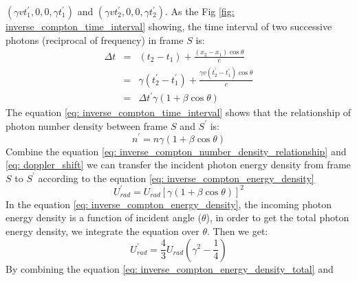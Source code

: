 \documentclass[12pt]{report}
\begin{document}
          $\left(\gamma v t_{1}^{\prime}, 0, 0, \gamma t_{1}^{\prime}\right)$ and 
          $\left(\gamma v t_{2}^{\prime}, 0, 0, \gamma t_{2}^{\prime}\right)$. 
          As the Fig \ref{fig: inverse_compton_time_interval} showing, the time interval of two successive 
          photons (reciprocal of frequency) in frame $S$ is: 
          \begin{eqnarray}
            \label{eq: inverse_compton_time_interval}
            \Delta t &=& \left(t_2 - t_1\right) + \frac{\left(x_2 - x_1\right) \cos{\theta}}{c}  \nonumber \\
                     &=& \gamma \left(t_{2}^{\prime} - t_{1}^{\prime}\right) + \frac{\gamma v \left(t_{2}^{\prime} - t_{1}^{\prime}\right) \cos{\theta}}{c} \nonumber \\
                     &=&  \Delta t^{\prime} \gamma \left(1 + \beta \cos{\theta}\right) 
          \end{eqnarray}
          The equation \ref{eq: inverse_compton_time_interval} shows that the relationship of photon number 
          density between frame $S$ and $S^{\prime}$ is:
          \begin{equation}
            \label{eq: inverse_compton_number_density_relationship}
            n^{\prime} = n \gamma \left(1 + \beta \cos{\theta}\right) 
          \end{equation}
          Combine the equation \ref{eq: inverse_compton_number_density_relationship} and 
          \ref{eq: doppler_shift} we can transfer the incident photon energy density from frame $S$ to 
          $S^{\prime}$ according to the equation \ref{eq: inverse_compton_energy_density}
          \begin{equation}
            \label{eq: inverse_compton_energy_density}
            U_{rad}^{\prime} = U_{rad} \left[\gamma \left(1 + \beta \cos{\theta}\right)\right]^{2}
          \end{equation}
          In the equation \ref{eq: inverse_compton_energy_density}, the incoming photon energy density 
          is a function of incident angle ($\theta$), in order to get the total photon energy density,
          we integrate the equation over $\theta$. Then we get: 
          \begin{equation}
            \label{eq: inverse_compton_energy_density_total}
            U_{rad}^{\prime} = \frac{4}{3} U_{rad} \left(\gamma^2 - \frac{1}{4}\right)
          \end{equation}
          By combining the equation \ref{eq: inverse_compton_energy_density_total} and 
\end{document}
